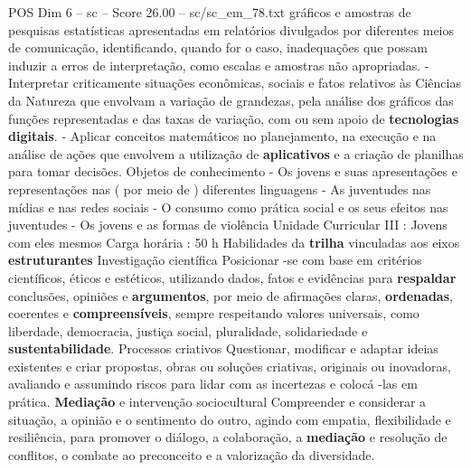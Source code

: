 \begin{textsample}{POS Dim 6 – sc – Score 26.00 – sc/sc\_em\_78.txt}
gráficos e amostras de pesquisas estatísticas apresentadas em relatórios divulgados por diferentes meios de comunicação, identificando, quando for o caso, inadequações que possam induzir a erros de interpretação, como escalas e amostras não apropriadas. - Interpretar criticamente situações econômicas, sociais e fatos relativos às Ciências da Natureza que envolvam a variação de grandezas, pela análise dos gráficos das funções representadas e das taxas de variação, com ou sem apoio de \textbf{tecnologias} \textbf{digitais}. - Aplicar conceitos matemáticos no planejamento, na execução e na análise de ações que envolvem a utilização de \textbf{aplicativos} e a criação de planilhas para tomar decisões.
Objetos de conhecimento - Os jovens e suas apresentações e representações nas ( por meio de ) diferentes linguagens - As juventudes nas mídias e nas redes sociais - O consumo como prática social e os seus efeitos nas juventudes - Os jovens e as formas de violência Unidade Curricular III : Jovens com eles mesmos Carga horária : 50 h Habilidades da \textbf{trilha} vinculadas aos eixos \textbf{estruturantes} Investigação científica Posicionar -se com base em critérios científicos, éticos e estéticos, utilizando dados, fatos e evidências para \textbf{respaldar} conclusões, opiniões e \textbf{argumentos}, por meio de afirmações claras, \textbf{ordenadas}, coerentes e \textbf{compreensíveis}, sempre respeitando valores universais, como liberdade, democracia, justiça social, pluralidade, solidariedade e \textbf{sustentabilidade}.
Processos criativos Questionar, modificar e adaptar ideias existentes e criar propostas, obras ou soluções criativas, originais ou inovadoras, avaliando e assumindo riscos para lidar com as incertezas e colocá -las em prática. \textbf{Mediação} e intervenção sociocultural Compreender e considerar a situação, a opinião e o sentimento do outro, agindo com empatia, flexibilidade e resiliência, para promover o diálogo, a colaboração, a \textbf{mediação} e resolução de conflitos, o combate ao preconceito e a valorização da diversidade.

\end{textsample}
